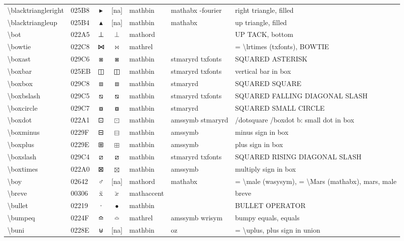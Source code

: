 \documentclass[a4paper,landscape]{article}
\begin{document}
\begin{longtable}{llcclll}
\textbackslash{}blacktriangleright & 025B8 & ▸ & [na] & mathbin & mathabx -fourier & right triangle, filled \\
\textbackslash{}blacktriangleup & 025B4 & ▴ & [na] & mathbin & mathabx & up triangle, filled \\
\textbackslash{}bot & 022A5 & ⊥ & $\bot$ & mathord &  & UP TACK, bottom \\
\textbackslash{}bowtie & 022C8 & ⋈ & $\bowtie$ & mathrel &  & = \textbackslash{}lrtimes (txfonts), BOWTIE \\
\textbackslash{}boxast & 029C6 & ⧆ & $\boxast$ & mathbin & stmaryrd txfonts & SQUARED ASTERISK \\
\textbackslash{}boxbar & 025EB & ◫ & $\boxbar$ & mathbin & stmaryrd txfonts & vertical bar in box \\
\textbackslash{}boxbox & 029C8 & ⧈ & $\boxbox$ & mathbin & stmaryrd & SQUARED SQUARE \\
\textbackslash{}boxbslash & 029C5 & ⧅ & $\boxbslash$ & mathbin & stmaryrd txfonts & SQUARED FALLING DIAGONAL SLASH \\
\textbackslash{}boxcircle & 029C7 & ⧇ & $\boxcircle$ & mathbin & stmaryrd & SQUARED SMALL CIRCLE \\
\textbackslash{}boxdot & 022A1 & ⊡ & $\boxdot$ & mathbin & amssymb stmaryrd & /dotsquare /boxdot b: small dot in box \\
\textbackslash{}boxminus & 0229F & ⊟ & $\boxminus$ & mathbin & amssymb & minus sign in box \\
\textbackslash{}boxplus & 0229E & ⊞ & $\boxplus$ & mathbin & amssymb & plus sign in box \\
\textbackslash{}boxslash & 029C4 & ⧄ & $\boxslash$ & mathbin & stmaryrd txfonts & SQUARED RISING DIAGONAL SLASH \\
\textbackslash{}boxtimes & 022A0 & ⊠ & $\boxtimes$ & mathbin & amssymb & multiply sign in box \\
\textbackslash{}boy & 02642 & \textsf ♂ & [na] & mathord & mathabx & = \textbackslash{}male (wasysym), = \textbackslash{}Mars (mathabx),  mars,  male \\
\textbackslash{}breve & 00306 & x̆ & $\breve{x}$ & mathaccent &  & breve \\
\textbackslash{}bullet & 02219 & ∙ & $\bullet$ & mathbin &  & BULLET OPERATOR \\
\textbackslash{}bumpeq & 0224F & ≏ & $\bumpeq$ & mathrel & amssymb wrisym & bumpy equals, equals \\
\textbackslash{}buni & 0228E & ⊎ & [na] & mathbin & oz & = \textbackslash{}uplus,  plus sign in union \\

\end{longtable}
\end{document}
